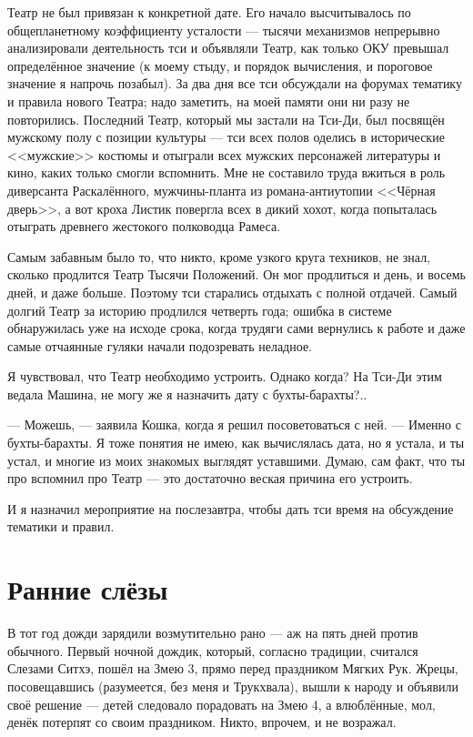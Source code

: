 Театр не был привязан к конкретной дате.
Его начало высчитывалось по общепланетному коэффициенту усталости --- тысячи механизмов непрерывно анализировали деятельность тси и объявляли Театр, как только ОКУ превышал определённое значение (к моему стыду, и порядок вычисления, и пороговое значение я напрочь позабыл).
За два дня все тси обсуждали на форумах тематику и правила нового Театра;
надо заметить, на моей памяти они ни разу не повторились.
Последний Театр, который мы застали на Тси-Ди, был посвящён мужскому полу с позиции культуры --- тси всех полов оделись в исторические <<мужские>> костюмы и отыграли всех мужских персонажей литературы и кино, каких только смогли вспомнить.
Мне не составило труда вжиться в роль диверсанта Раскалённого, мужчины-планта из романа-антиутопии <<Чёрная дверь>>, а вот кроха Листик повергла всех в дикий хохот, когда попыталась отыграть древнего жестокого полководца Рамеса.

Самым забавным было то, что никто, кроме узкого круга техников, не знал, сколько продлится Театр Тысячи Положений.
Он мог продлиться и день, и восемь дней, и даже больше.
Поэтому тси старались отдыхать с полной отдачей.
Самый долгий Театр за историю продлился четверть года;
ошибка в системе обнаружилась уже на исходе срока, когда трудяги сами вернулись к работе и даже самые отчаянные гуляки начали подозревать неладное.

Я чувствовал, что Театр необходимо устроить.
Однако когда?
На Тси-Ди этим ведала Машина, не могу же я назначить дату с бухты-барахты?..

--- Можешь, --- заявила Кошка, когда я решил посоветоваться с ней.
--- Именно с бухты-барахты.
Я тоже понятия не имею, как вычислялась дата, но я устала, и ты устал, и многие из моих знакомых выглядят уставшими.
Думаю, сам факт, что ты про вспомнил про Театр --- это достаточно веская причина его устроить.

И я назначил мероприятие на послезавтра, чтобы дать тси время на обсуждение тематики и правил.

\section{Ранние слёзы}

В тот год дожди зарядили возмутительно рано --- аж на пять дней против обычного.
Первый ночной дождик, который, согласно традиции, считался Слезами Ситхэ, пошёл на Змею 3, прямо перед праздником Мягких Рук.
Жрецы, посовещавшись (разумеется, без меня и Трукхвала), вышли к народу и объявили своё решение --- детей следовало порадовать на Змею 4, а влюблённые, мол, денёк потерпят со своим праздником.
Никто, впрочем, и не возражал.

